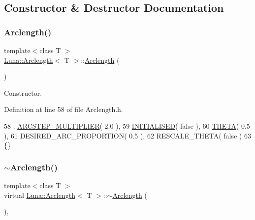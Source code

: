 \subsection{Constructor \& Destructor Documentation}
\mbox{\label{classLuna_1_1Arclength_afa2eac838a1005897d0f82815764237f}} 
\subsubsection{\texorpdfstring{Arclength()}{Arclength()}}
{\footnotesize\ttfamily template$<$class T $>$ \\
\hyperlink{classLuna_1_1Arclength}{Luna\+::\+Arclength}$<$ T $>$\+::\hyperlink{classLuna_1_1Arclength}{Arclength} (\begin{DoxyParamCaption}{ }\end{DoxyParamCaption})\hspace{0.3cm}{\ttfamily [inline]}}



Constructor. 



Definition at line 58 of file Arclength.\+h.


\begin{DoxyCode}
58                   : \hyperlink{classLuna_1_1Arclength_ae1ff8d41d3e81d9ce335d19de4a269cc}{ARCSTEP\_MULTIPLIER}( 2.0 ),
59                     \hyperlink{classLuna_1_1Arclength_a9bf5e636e7a0772f3ba5476ec2c83f6a}{INITIALISED}( \textcolor{keyword}{false} ),
60                     \hyperlink{classLuna_1_1Arclength_aa17766cf4bcbe5b063dc2a95f89baf42}{THETA}( 0.5 ),
61                     DESIRED\_ARC\_PROPORTION( 0.5 ),
62                     RESCALE\_THETA( \textcolor{keyword}{false} )
63       \{\}
\end{DoxyCode}
\mbox{\label{classLuna_1_1Arclength_acd49e172150ec06785b68bf84a9e818e}} 
\subsubsection{\texorpdfstring{$\sim$\+Arclength()}{~Arclength()}}
{\footnotesize\ttfamily template$<$class T $>$ \\
virtual \hyperlink{classLuna_1_1Arclength}{Luna\+::\+Arclength}$<$ T $>$\+::$\sim$\hyperlink{classLuna_1_1Arclength}{Arclength} (\begin{DoxyParamCaption}{ }\end{DoxyParamCaption})\hspace{0.3cm}{\ttfamily [inline]}, {\ttfamily [virtual]}}



